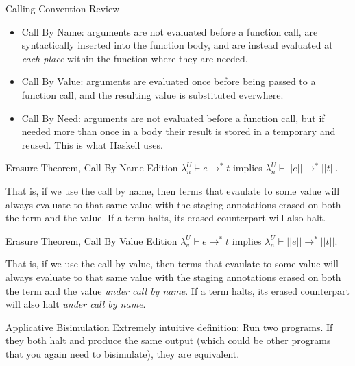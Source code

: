 \documentclass{beamer}
\begin{document}
\begin{frame}{Calling Convention Review}
\begin{itemize}
  \item Call By Name: arguments are not evaluated before a function call, are syntactically inserted into the function body, and are instead evaluated at \textit{each place} within the function where they are needed.
  \item Call By Value: arguments are evaluated once before being passed to a function call, and the resulting value is substituted everwhere.
  \item Call By Need: arguments are not evaluated before a function call, but if needed more than once in a body their result is stored in a temporary and reused. This is what Haskell uses.
\end{itemize}
\end{frame}


\begin{frame}{Erasure Theorem, Call By Name Edition}
$\lambda _n ^U \vdash e \rightarrow ^* t$ implies $\lambda _n ^U \vdash ||e|| \rightarrow ^* ||t||$.\\
\vspace{1cm} 

That is, if we use the call by name, then terms that evaulate to some
value will always evaluate to that same value with the staging
annotations erased on both the term and the value. If a term halts,
its erased counterpart will also halt.
\end{frame}

\begin{frame}{Erasure Theorem, Call By Value Edition}
$\lambda _v ^U \vdash e \rightarrow ^* t$ implies $\lambda _n ^U \vdash ||e|| \rightarrow ^* ||t||$.\\
\vspace{1cm}

That is, if we use the call by value, then terms that evaulate to some
value will always evaluate to that same value with the staging
annotations erased on both the term and the value \textit{under call
  by name}. If a term halts, its erased counterpart will also halt
\textit{under call by name}.
\end{frame}



\begin{frame}{Applicative Bisimulation}
Extremely intuitive definition: Run two programs. If they both halt
and produce the same output (which could be other programs that you
again need to bisimulate), they are equivalent.
\end{frame}
\end{document}
